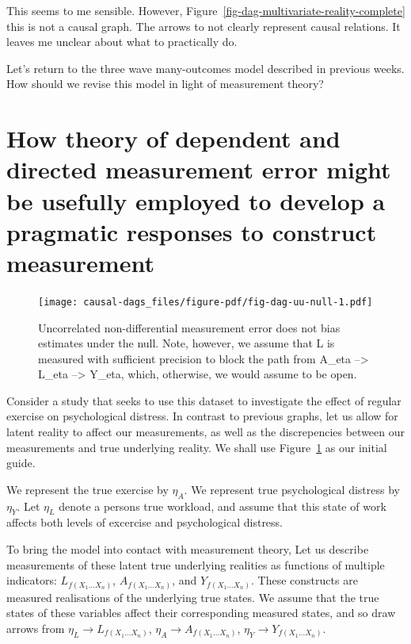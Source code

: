 \documentclass[
  singlecolumn]{report}
\begin{document}
This seems to me sensible. However,
Figure~\ref{fig-dag-multivariate-reality-complete} this is not a causal
graph. The arrows to not clearly represent causal relations. It leaves
me unclear about what to practically do.

Let's return to the three wave many-outcomes model described in previous
weeks. How should we revise this model in light of measurement theory?

\hypertarget{how-theory-of-dependent-and-directed-measurement-error-might-be-usefully-employed-to-develop-a-pragmatic-responses-to-construct-measurement}{%
\section{How theory of dependent and directed measurement error might be
usefully employed to develop a pragmatic responses to construct
measurement}\label{how-theory-of-dependent-and-directed-measurement-error-might-be-usefully-employed-to-develop-a-pragmatic-responses-to-construct-measurement}}

\begin{figure}

{\centering \texttt{[image: causal-dags\_files/figure-pdf/fig-dag-uu-null-1.pdf]}

}

\caption{\label{fig-dag-uu-null}Uncorrelated non-differential
measurement error does not bias estimates under the null. Note, however,
we assume that L is measured with sufficient precision to block the path
from A\_eta --\textgreater{} L\_eta --\textgreater{} Y\_eta, which,
otherwise, we would assume to be open.}

\end{figure}

Consider a study that seeks to use this dataset to investigate the
effect of regular exercise on psychological distress. In contrast to
previous graphs, let us allow for latent reality to affect our
measurements, as well as the discrepencies between our measurements and
true underlying reality. We shall use Figure~\ref{fig-dag-uu-null} as
our initial guide.

We represent the true exercise by \(\eta_A\). We represent true
psychological distress by \(\eta_Y\). Let \(\eta_L\) denote a persons
true workload, and assume that this state of work affects both levels of
excercise and psychological distress.

To bring the model into contact with measurement theory, Let us describe
measurements of these latent true underlying realities as functions of
multiple indicators: \(L_{f(X_1\dots X_n)}\), \(A_{f(X_1\dots X_n)}\),
and \(Y_{f(X_1\dots X_n)}\). These constructs are measured realisations
of the underlying true states. We assume that the true states of these
variables affect their corresponding measured states, and so draw arrows
from \(\eta_L\rightarrow{L_{f(X_1\dots X_n)}}\),
\(\eta_A\rightarrow{A_{f(X_1\dots X_n)}}\),
\(\eta_Y\rightarrow{Y_{f(X_1\dots X_n)}}\).
\end{document}
